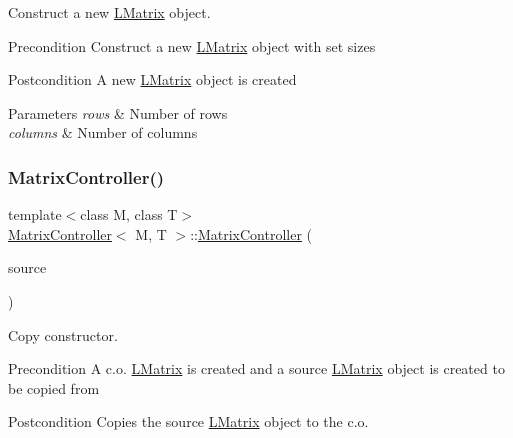 Construct a new \mbox{\hyperlink{class_l_matrix}{L\+Matrix}} object. 

\begin{DoxyPrecond}{Precondition}
Construct a new \mbox{\hyperlink{class_l_matrix}{L\+Matrix}} object with set sizes 
\end{DoxyPrecond}
\begin{DoxyPostcond}{Postcondition}
A new \mbox{\hyperlink{class_l_matrix}{L\+Matrix}} object is created 
\end{DoxyPostcond}

\begin{DoxyParams}{Parameters}
{\em rows} & Number of rows \\
\hline
{\em columns} & Number of columns \\
\hline
\end{DoxyParams}
\mbox{\label{class_matrix_controller_a2a97e643dacd9162bb88c680c7169f5c}} 
\subsubsection{\texorpdfstring{MatrixController()}{MatrixController()}\hspace{0.1cm}{\footnotesize\ttfamily [3/3]}}
{\footnotesize\ttfamily template$<$class M, class T$>$ \\
\mbox{\hyperlink{class_matrix_controller}{Matrix\+Controller}}$<$ M, T $>$\+::\mbox{\hyperlink{class_matrix_controller}{Matrix\+Controller}} (\begin{DoxyParamCaption}\item[{const \mbox{\hyperlink{class_matrix_controller}{Matrix\+Controller}}$<$ M, T $>$ \&}]{source }\end{DoxyParamCaption})}



Copy constructor. 

\begin{DoxyPrecond}{Precondition}
A c.\+o. \mbox{\hyperlink{class_l_matrix}{L\+Matrix}} is created and a source \mbox{\hyperlink{class_l_matrix}{L\+Matrix}} object is created to be copied from 
\end{DoxyPrecond}
\begin{DoxyPostcond}{Postcondition}
Copies the source \mbox{\hyperlink{class_l_matrix}{L\+Matrix}} object to the c.\+o. 
\end{DoxyPostcond}

